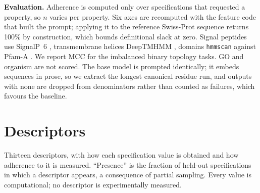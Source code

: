 \documentclass{article}
\newcommand{\pct}{\%}
\begin{document}
\textbf{Evaluation.} Adherence is computed only over specifications that
requested a property, so $n$ varies per property. Six axes are recomputed with
the feature code that built the prompt; applying it to the reference Swiss-Prot
sequence returns 100\pct{} by construction, which bounds definitional slack at
zero. Signal peptides use SignalP~6 \citep{teufel2022signalp6}, transmembrane
helices DeepTMHMM \citep{hallgren2022deeptmhmm}, domains \texttt{hmmscan}
\citep{eddy2011hmmer} against Pfam-A \citep{mistry2021pfam}. We report MCC for
the imbalanced binary topology tasks. GO and organism are not scored. The base
model is prompted identically; it embeds sequences in prose, so we extract the
longest canonical residue run, and outputs with none are dropped from
denominators rather than counted as failures, which favours the baseline.

\section{Descriptors}\label{app:desc}
Thirteen descriptors, with how each specification value is obtained and how
adherence to it is measured. ``Presence'' is the fraction of held-out
specifications in which a descriptor appears, a consequence of partial sampling.
Every value is computational; no descriptor is experimentally measured.
\end{document}
